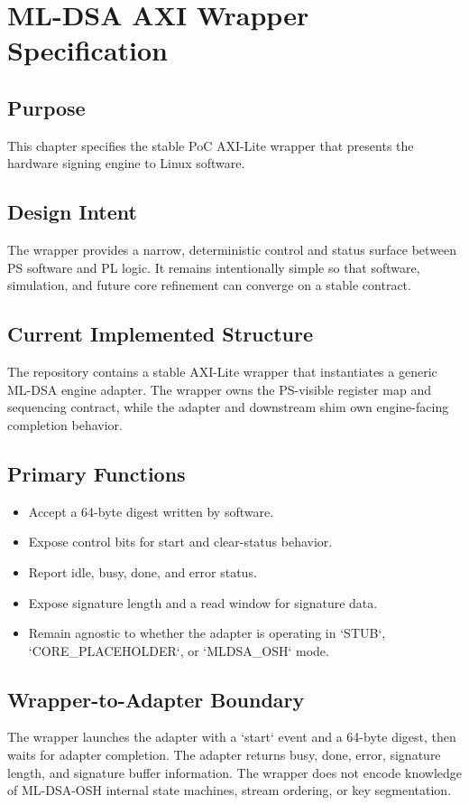 \chapter{ML-DSA AXI Wrapper Specification}

\section*{Purpose}
This chapter specifies the stable PoC AXI-Lite wrapper that presents the hardware signing engine to Linux software.

\section{Design Intent}
The wrapper provides a narrow, deterministic control and status surface between PS software and PL logic. It remains intentionally simple so that software, simulation, and future core refinement can converge on a stable contract.

\section{Current Implemented Structure}
The repository contains a stable AXI-Lite wrapper that instantiates a generic ML-DSA engine adapter. The wrapper owns the PS-visible register map and sequencing contract, while the adapter and downstream shim own engine-facing completion behavior.

\section{Primary Functions}
\begin{itemize}[leftmargin=*]
  \item Accept a 64-byte digest written by software.
  \item Expose control bits for start and clear-status behavior.
  \item Report idle, busy, done, and error status.
  \item Expose signature length and a read window for signature data.
  \item Remain agnostic to whether the adapter is operating in `STUB`, `CORE\_PLACEHOLDER`, or `MLDSA\_OSH` mode.
\end{itemize}

\section{Wrapper-to-Adapter Boundary}
The wrapper launches the adapter with a `start` event and a 64-byte digest, then waits for adapter completion. The adapter returns busy, done, error, signature length, and signature buffer information. The wrapper does not encode knowledge of ML-DSA-OSH internal state machines, stream ordering, or key segmentation.

